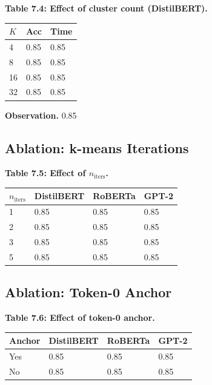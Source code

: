 \textbf{Table 7.4: Effect of cluster count (DistilBERT).}

\begin{table}[H]
\centering
\small
\begin{tabular}{lll}
\toprule
\textbf{$K$} & \textbf{Acc} & \textbf{Time} \\
\midrule
4 & 0.85 & 0.85 \\
8 & 0.85 & 0.85 \\
16 & 0.85 & 0.85 \\
32 & 0.85 & 0.85 \\
\bottomrule
\end{tabular}
\end{table}

\textbf{Observation.} 0.85

\subsection{Ablation: k-means Iterations}

\textbf{Table 7.5: Effect of $n_{\text{iters}}$.}

\begin{table}[H]
\centering
\small
\begin{tabular}{llll}
\toprule
\textbf{$n_{\text{iters}}$} & \textbf{DistilBERT} & \textbf{RoBERTa} & \textbf{GPT-2} \\
\midrule
1 & 0.85 & 0.85 & 0.85 \\
2 & 0.85 & 0.85 & 0.85 \\
3 & 0.85 & 0.85 & 0.85 \\
5 & 0.85 & 0.85 & 0.85 \\
\bottomrule
\end{tabular}
\end{table}

\subsection{Ablation: Token-0 Anchor}

\textbf{Table 7.6: Effect of token-0 anchor.}

\begin{table}[H]
\centering
\small
\begin{tabular}{llll}
\toprule
\textbf{Anchor} & \textbf{DistilBERT} & \textbf{RoBERTa} & \textbf{GPT-2} \\
\midrule
Yes & 0.85 & 0.85 & 0.85 \\
No & 0.85 & 0.85 & 0.85 \\
\bottomrule
\end{tabular}
\end{table}

